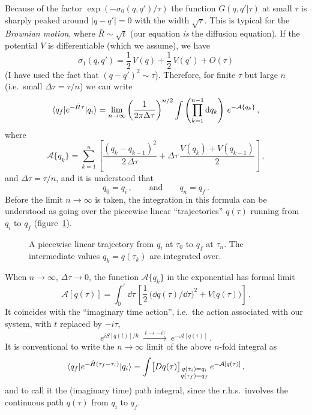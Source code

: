 Because of the factor $\exp(-\sigma_0(q,q')/\tau)$ the function
$G(q,q'|\tau)$ at small $\tau$ is sharply peaked around $|q-q'|=0$ with the
width $\sqrt\tau$. This is typical for the \emph{Brownian motion}, where
$\bar R\sim\sqrt t$ (our equation \emph{is} the diffusion equation). If the
potential $V$ is differentiable (which we assume), we have
\[
\sigma_1(q,q')=\frac12\,V(q)+\frac12\,V(q')+O(\tau)
\]
(I have used the fact that $(q-q')^2\sim\tau$). Therefore, for finite $\tau$
but large $n$ (i.e.\ small $\Delta\tau=\tau/n$) we can write
\[
\langle q_f|e^{-\hat H\tau}|q_i\rangle=\lim_{n\to\infty}\left(\frac1{2\pi\Delta\tau}\right)^{n/2}\int\left(\prod_{k=1}^{n-1}\mathop{}\!\mathrm{d} q_k\right)\,e^{-\mathcal A\{q_k\}}\,,
\]
where
\[
\mathcal A\{q_k\}=\sum_{k=1}^n\left[\frac{(q_k-q_{k-1})^2}{2\,\Delta\tau}+\Delta\tau\,\frac{V(q_k)+V(q_{k-1})}{2}\right]\,,
\]
and $\Delta\tau=\tau/n$, and it is understood that
\[
q_0=q_i\,,\qquad\text{and}\qquad q_n=q_f\,.
\]
Before the limit $n\to\infty$ is taken, the integration in this formula can be
understood as going over the piecewise linear ``trajectories'' $q(\tau)$
running from $q_i$ to $q_f$ (figure~\ref{fig:piecewise}).
\begin{figure}[ht]
\centering{}
\caption{A piecewise linear trajectory from $q_i$ at $\tau_0$ to $q_f$ at
$\tau_n$. The intermediate values $q_k=q(\tau_k)$ are integrated over.}
\label{fig:piecewise}
\end{figure}

When $n\to\infty$, $\Delta\tau\to0$, the function $\mathcal A\{q_k\}$ in the
exponential has formal limit
\[
\mathcal A[q(\tau)]=\int_0^\tau \dd\tau\,\left[\frac12\,\bigl(\dd q(\tau)/\dd\tau\bigr)^2+V\bigl(q(\tau)\bigr)\right]\,.
\]
It coincides with the ``imaginary time action'', i.e.\ the action associated
with our system, with $t$ replaced by $-i\tau$,
\[
e^{iS[q(t)]/\hbar}\ \xrightarrow{\ t\to-i\tau\ }\ e^{-\mathcal A[q(\tau)]}\,.
\]
It is conventional to write the $n\to\infty$ limit of the above $n$-fold
integral as
\[
\langle q_f|e^{-\hat H(\tau_f-\tau_i)}|q_i\rangle=\int\bigl[Dq(\tau)\bigr]_{\substack{q(\tau_i)=q_i\\q(\tau_f)=q_f}}\,e^{-\mathcal A[q(\tau)]}\,,
\]
and to call it the (imaginary time) path integral, since the r.h.s.\ involves
the continuous path $q(\tau)$ from $q_i$ to $q_f$.

